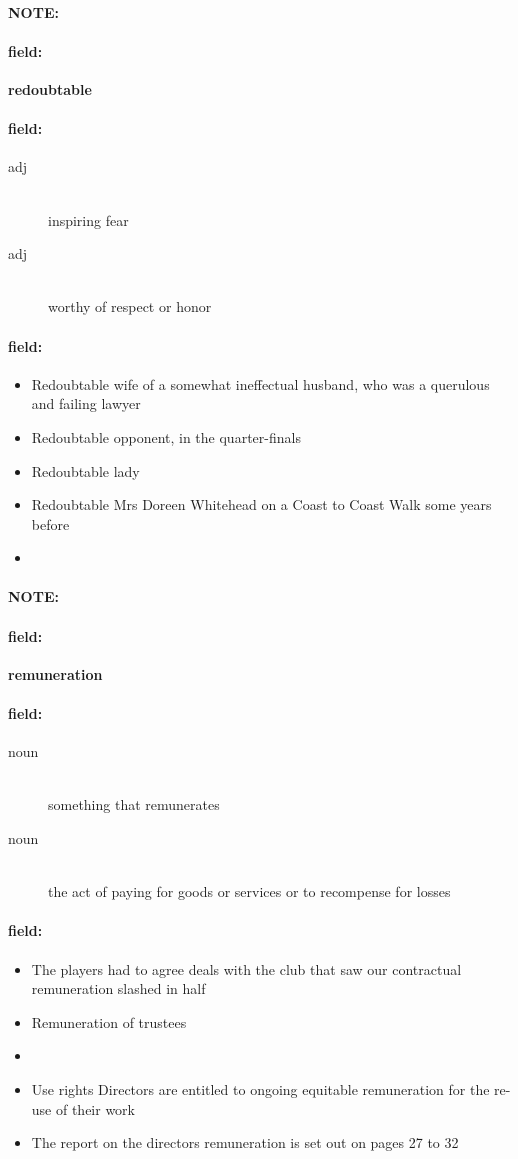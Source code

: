 \documentclass[12pt]{article}
\newenvironment{note}{\paragraph{NOTE:}}{}
\newenvironment{field}{\paragraph{field:}}{}
\begin{document}
\begin{note}
\begin{field}
\textbf{\large redoubtable}
\end{field}


\begin{field}
\begin{description}
\item[adj] \hfill \\ 
inspiring fear

\item[adj] \hfill \\ 
worthy of respect or honor

\end{description}
\end{field}

\begin{field}
\begin{itemize}
\item Redoubtable wife of a somewhat ineffectual husband, who was a querulous and failing lawyer
\item Redoubtable opponent, in the quarter-finals
\item Redoubtable lady
\item Redoubtable Mrs Doreen Whitehead on a Coast to Coast Walk some years before
\item 
\end{itemize}
\end{field}
\end{note}
\begin{note}
\begin{field}
\textbf{\large remuneration}
\end{field}


\begin{field}
\begin{description}
\item[noun] \hfill \\ 
something that remunerates

\item[noun] \hfill \\ 
the act of paying for goods or services or to recompense for losses

\end{description}
\end{field}

\begin{field}
\begin{itemize}
\item The players had to agree deals with the club that saw our contractual remuneration slashed in half
\item Remuneration of trustees
\item 
\item Use rights Directors are entitled to ongoing equitable remuneration for the re-use of their work
\item The report on the directors remuneration is set out on pages 27 to 32
\end{itemize}
\end{field}
\end{note}
\end{document}
